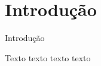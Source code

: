 \chapter*[Introdução]{Introdução}

  \begin{center}
    \Large{Introdução}
  \end{center}

  Texto texto texto texto 
